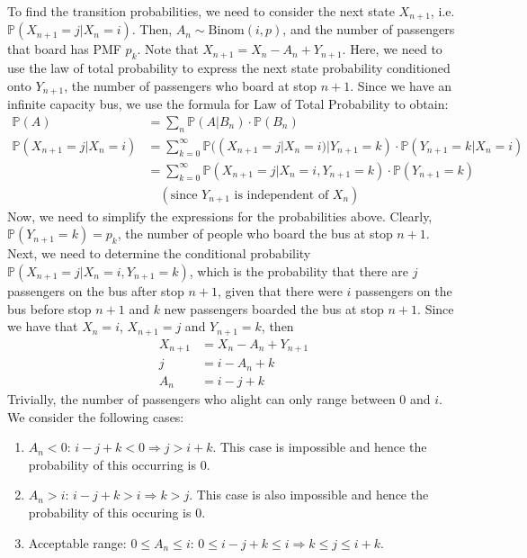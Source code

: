 \documentclass[12pt]{article}
\begin{document}
\noindent To find the transition probabilities, we need to consider the next state $X_{n+1}$, i.e. $ \mathbb{P}(X_{n+1} = j | X_n = i)$. Then, $A_n \sim \text{Binom}(i, p)$, and the number of passengers that board has PMF $p_k$. Note that $X_{n+1} = X_n - A_n + Y_{n+1}$. Here, we need to use the law of total probability to express the next state probability conditioned onto $Y_{n+1}$, the number of passengers who board at stop $n+1$. Since we have an infinite capacity bus, we use the formula for Law of Total Probability to obtain: \begin{align*}
    \mathbb{P}(A) &= \sum_{n} \mathbb{P}(A | B_n) \cdot \mathbb{P}(B_n) \\ 
    \mathbb{P}(X_{n+1} = j | X_n = i) &= \sum_{k=0}^{\infty} \mathbb{P}((X_{n+1} = j | X_n = i) | Y_{n+1} = k) \cdot \mathbb{P}(Y_{n+1} = k | X_n = i) \\ 
    &= \sum_{k=0}^{\infty} \mathbb{P}(X_{n+1} = j | X_n = i, Y_{n+1} = k) \cdot \mathbb{P}(Y_{n+1} = k) \\ 
    & \quad (\text{since } Y_{n+1} \text{ is independent of } X_n)
\end{align*} Now, we need to simplify the expressions for the probabilities above. Clearly, $ \mathbb{P}(Y_{n+1} = k) = p_k$, the number of people who board the bus at stop $n+1$. Next, we need to determine the conditional probability $ \mathbb{P}(X_{n+1} = j | X_n = i, Y_{n +1} = k)$, which is the probability that there are $j$ passengers on the bus after stop $n+1$, given that there were $i$ passengers on the bus before stop $n+1$ and $k$ new passengers boarded the bus at stop $n+1$. Since we have that $X_n = i$, $X_{n+1} = j$ and $Y_{n+1} = k$, then \begin{align*}
    X_{n+1} &= X_n - A_n + Y_{n+1} \\ 
    j &= i - A_n + k \\ 
    A_n &= i - j + k
\end{align*} Trivially, the number of passengers who alight can only range between 0 and $i$. We consider the following cases: \begin{enumerate}
    \item $A_n < 0$: $i - j + k < 0 \Longrightarrow j > i + k$. This case is impossible and hence the probability of this occurring is 0. 
    \item $A_n > i$: $i - j + k > i \Longrightarrow k > j$. This case is also impossible and hence the probability of this occuring is 0. 
    \item Acceptable range: $0 \leq A_n \leq i$: $0 \leq i - j + k \leq i \Longrightarrow k \leq j \leq i+k$. 
\end{enumerate} 
\end{document}
